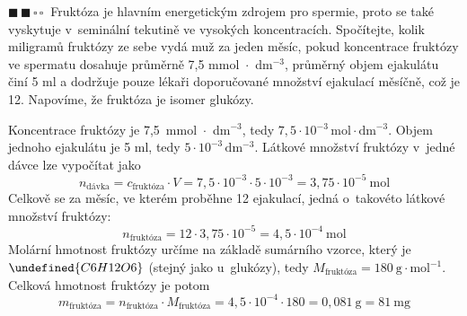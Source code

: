 \documentclass{book}
\let\ch\undefined
\newcommand{\dva}{$\blacksquare \, \blacksquare \, \square \, \square \; \; $}
\renewenvironment{quotation}{\par}{\par} %
\begin{document}
\begin{quotation}
\dva Fruktóza je hlavním energetickým zdrojem pro spermie, proto se také
vyskytuje v~seminální tekutině ve vysokých koncentracích. Spočítejte,
kolik miligramů fruktózy ze sebe vydá muž za jeden měsíc, pokud koncentrace
fruktózy ve spermatu dosahuje průměrně 7,5 mmol~$\cdot$~dm$^{-3}$,
průměrný objem ejakulátu činí 5 ml a dodržuje pouze lékaři doporučované
množství ejakulací měsíčně, což je 12. Napovíme, že fruktóza je isomer
glukózy.
\end{quotation} \dotfill \par 
Koncentrace fruktózy je 7,5~mmol~$\cdot$~dm$^{-3}$, tedy $7,5\cdot10{}^{-3}\,\mathrm{mol\cdot dm^{-3}}$.
Objem jednoho ejakulátu je 5 ml, tedy $5\cdot10^{-3}\, \mathrm{dm^{-3}}$. Látkové
množství fruktózy v~jedné dávce lze vypočítat jako 
\[
n_{\text{dávka}} = c_{\text{fruktóza}}\cdot V=7,5\cdot 10^{-3} \cdot 5\cdot 10^{-3} =3,75\cdot10^{-5}\mathrm{\ mol}
\]
Celkově se za měsíc, ve kterém proběhne 12 ejakulací, jedná o~takovéto látkové množství fruktózy:
\[
n_{\text{fruktóza}} = 12\cdot3,75\cdot10^{-5}=4,5\cdot10^{-4}\mathrm{\ mol}
\]
Molární hmotnost fruktózy určíme na základě sumárního
vzorce, který je $\ch{C6H12O6}$ (stejný jako u~glukózy), tedy $M_{\text{fruktóza}}=180\mathrm{\ g\cdot mol^{-1}}$.
Celková hmotnost fruktózy je potom
\[
m_{\text{fruktóza}}=n_{\text{fruktóza}}\cdot M_{\text{fruktóza}}=4,5\cdot10^{-4}\cdot180=0,081\mathrm{\ g}=81\ \mathrm{mg}
\]
\end{document}
